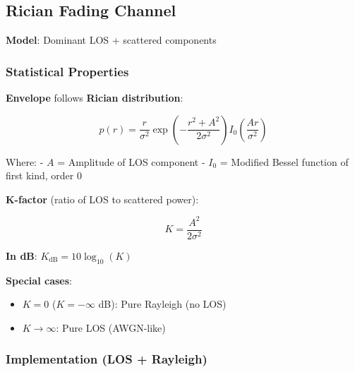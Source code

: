 \subsection{Rician Fading Channel}\label{rician-fading-channel}

\textbf{Model}: Dominant LOS + scattered components

\subsubsection{Statistical Properties}\label{statistical-properties-1}

\textbf{Envelope} follows \textbf{Rician distribution}:

\[
p(r) = \frac{r}{\sigma^2} \exp\left(-\frac{r^2 + A^2}{2\sigma^2}\right) I_0\left(\frac{Ar}{\sigma^2}\right)
\]

Where: - \(A\) = Amplitude of LOS component - \(I_0\) = Modified Bessel
function of first kind, order 0

\textbf{K-factor} (ratio of LOS to scattered power):

\[
K = \frac{A^2}{2\sigma^2}
\]

\textbf{In dB}: \(K_{\text{dB}} = 10\log_{10}(K)\)

\textbf{Special cases}: 
\begin{itemize}
\item $K = 0$ ($K = -\infty$ dB): Pure Rayleigh (no LOS)
\item $K \to \infty$: Pure LOS (AWGN-like)
\end{itemize}


\subsubsection{Implementation (LOS +
Rayleigh)}\label{implementation-los-rayleigh}

